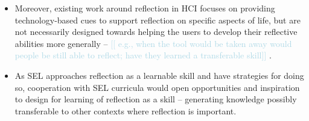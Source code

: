 \documentclass[prodmode,acmtochi]{acmsmall}
\newcommand{\todo}[1]{\textrm{\textrm{\textcolor{LightBlue}{[[#1]]} } } }
\begin{document}
\begin{itemize}
\item Moreover, existing work around reflection in HCI focuses on providing technology-based cues to support reflection on specific aspects of life, but are not necessarily designed towards helping the users to develop their reflective abilities more generally -- \todo{ e.g., when the tool would be taken away would people be still able to reflect; have they learned a transferable skill}. 

\item As SEL approaches reflection as a learnable skill and have strategies for doing so, cooperation with SEL curricula would open opportunities and inspiration to design for learning of reflection as a skill -- generating knowledge possibly transferable to other contexts where reflection is important. 



\end{itemize}

\end{document}
